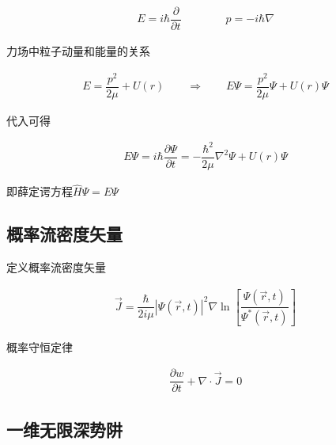 \begin{equation*}
  \begin{aligned}
    E = i \hbar \dfrac{\partial}{\partial t} \quad\quad \quad\quad p = - i \hbar \nabla
  \end{aligned}
\end{equation*}

力场中粒子动量和能量的关系

\begin{equation*}
  \begin{aligned}
    E = \dfrac{p^2}{2 \mu} + U (r) \quad\quad  \Rightarrow \quad\quad E \Psi = \dfrac{p^2}{2\mu} \Psi + U (r) \Psi  
  \end{aligned}
\end{equation*}

代入可得

\begin{equation*}
  \begin{aligned}
    E \Psi = i \hbar \dfrac{\partial \Psi}{\partial t} = - \dfrac{\hbar^2}{2\mu} \nabla^2 \Psi + U (r) \Psi  
  \end{aligned}
\end{equation*}

即薛定谔方程$\hat{H} \Psi = E \Psi$

\subsection{概率流密度矢量}

定义概率流密度矢量

\begin{equation}
  \label{eq:概率流密度矢量}
  \begin{aligned}
    \vec{J} = \dfrac{\hbar}{2 i \mu} \left| \Psi \left( \vec{r}, t \right) \right|^2 \nabla \ln \left[ \dfrac{\Psi \left( \vec{r}, t \right)}{\Psi^{*} \left( \vec{r}, t \right)}  \right]
  \end{aligned}
\end{equation}

概率守恒定律

\begin{equation*}
  \begin{aligned}
    \dfrac{\partial w}{\partial t} + \nabla \cdot \vec{J} = 0 
  \end{aligned}
\end{equation*}

\subsection{一维无限深势阱}

